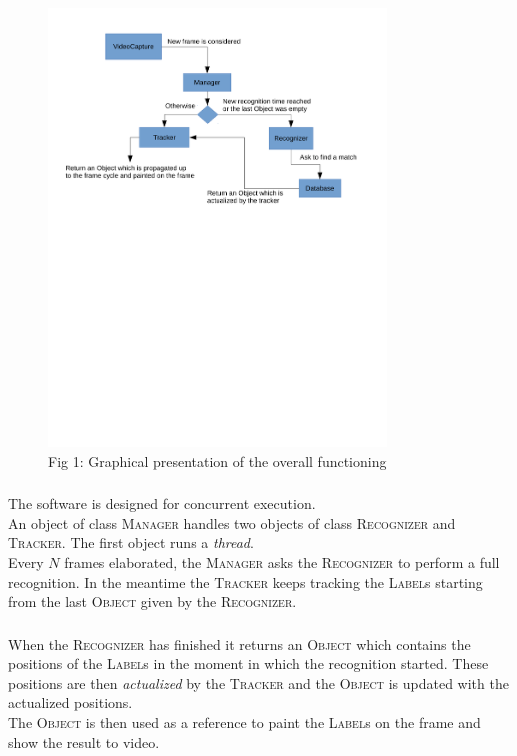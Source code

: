 \documentclass{beamer}
\begin{document}
  \begin{frame}
    \frametitle{\insertsection}
	\begin{figure}
		\centering
		\includegraphics[width=0.8\textwidth]{images/main_flow.pdf}\\
		Fig 1: Graphical presentation of the overall functioning
	\end{figure}
  \end{frame}

  \begin{frame}
    \frametitle{\insertsection}
    The software is designed for concurrent execution.\\
    An object of class \textsc{Manager} handles two objects of class \textsc{Recognizer} and
    \textsc{Tracker}. The first object runs a \emph{thread}.\\
    Every $N$ frames elaborated, the \textsc{Manager} asks the
    \textsc{Recognizer} to perform a full recognition. In the meantime the
    \textsc{Tracker} keeps tracking the \textsc{Label}s starting from the last
    \textsc{Object} given by the \textsc{Recognizer}.\\
  \end{frame}

  \begin{frame}
    \frametitle{\insertsection}
    When the \textsc{Recognizer} has finished it returns an \textsc{Object}
    which contains the positions of the \textsc{Label}s in the moment in which
    the recognition started. These positions are then \emph{actualized} by the
    \textsc{Tracker} and the \textsc{Object} is updated with the actualized positions.\\
	The \textsc{Object} is then used as a reference to paint the \textsc{Label}s on the
	frame and show the result to video.
  \end{frame}
\end{document}
